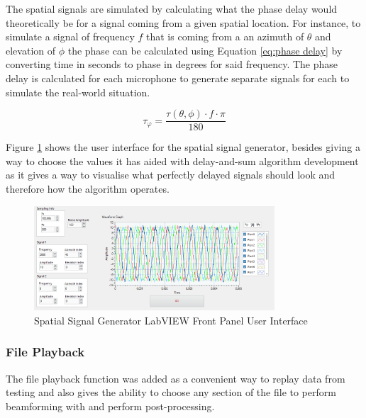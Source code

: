 \documentclass{UoNMCHA}
\numberwithin{equation}{section}
\begin{document}
    The spatial signals are simulated by calculating what the phase delay would theoretically be for a signal coming from a given spatial location. For instance, to simulate a signal of frequency $f$ that is coming from a an azimuth of $\theta$ and elevation of $\phi$ the phase can be calculated using Equation \ref{eq:phase delay} by converting time in seconds to phase in degrees for said frequency. The phase delay is calculated for each microphone to generate separate signals for each to simulate the real-world situation.
    
    \begin{equation}
        \tau_{\varphi} = \frac{\tau(\theta,\phi) \cdot f \cdot \pi}{180}
        \label{eq:phase delay}
    \end{equation}
    
    Figure \ref{fig:SignalGenPanel} shows the user interface for the spatial signal generator, besides giving a way to choose the values it has aided with delay-and-sum algorithm development as it gives a way to visualise what perfectly delayed signals should look and therefore how the algorithm operates.
    
    \begin{figure}[H]
        \centering
        \includegraphics[keepaspectratio, width = 0.8\textwidth]{Figures/SignalGenPanel_5ULA50mm.png}
        \caption{Spatial Signal Generator LabVIEW Front Panel User Interface}
        \label{fig:SignalGenPanel}
    \end{figure}    

\subsubsection{File Playback} \label{sec:File Playback}

The file playback function was added as a convenient way to replay data from testing and also gives the ability to choose any section of the file to perform beamforming with and perform post-processing.
\end{document}
